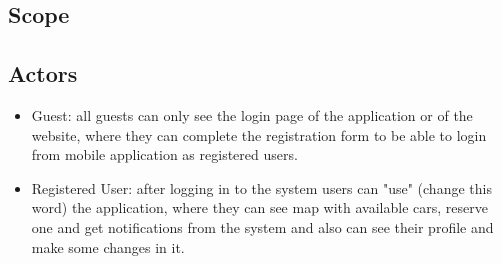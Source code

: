 \documentclass{article}
\begin{document}
		\subsection{Scope}
		
		\subsection{Actors}
		
		\begin{itemize}
			\item Guest: all guests can only see the login page of the application or of the website, where they can complete the registration form to be able to login from mobile application as registered users.
			
			\item Registered User: after logging in to the system users can "use" (change this word) the application, where they can see map with available cars, reserve one and get notifications from the system and also can see their profile and make some changes in it.   
		\end{itemize}  	
\end{document}
